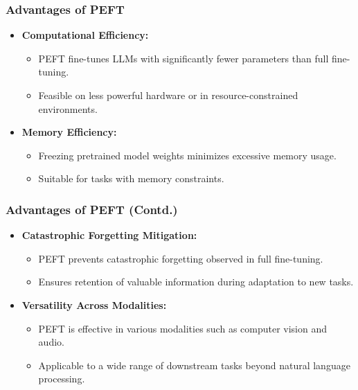 \begin{frame}[fragile]\frametitle{Advantages of PEFT}
  \begin{itemize}
    \item \textbf{Computational Efficiency:}
      \begin{itemize}
        \item PEFT fine-tunes LLMs with significantly fewer parameters than full fine-tuning.
        \item Feasible on less powerful hardware or in resource-constrained environments.
      \end{itemize}
    \item \textbf{Memory Efficiency:}
      \begin{itemize}
        \item Freezing pretrained model weights minimizes excessive memory usage.
        \item Suitable for tasks with memory constraints.
      \end{itemize}
  \end{itemize}
\end{frame}

\begin{frame}[fragile]\frametitle{Advantages of PEFT (Contd.)}
  \begin{itemize}
    \item \textbf{Catastrophic Forgetting Mitigation:}
      \begin{itemize}
        \item PEFT prevents catastrophic forgetting observed in full fine-tuning.
        \item Ensures retention of valuable information during adaptation to new tasks.
      \end{itemize}
    \item \textbf{Versatility Across Modalities:}
      \begin{itemize}
        \item PEFT is effective in various modalities such as computer vision and audio.
        \item Applicable to a wide range of downstream tasks beyond natural language processing.
      \end{itemize}
  \end{itemize}
\end{frame}

